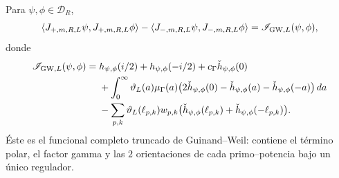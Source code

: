 \begin{lemma}
\label{lem:amp-rh-expansion-guinand-weil}
Para \(\psi,\phi\in\mathcal D_R\),
\begin{equation}\label{eq:amp-rh-diferencia-columnas-regulada}
 \langle J_{+,m,R,L}\psi,J_{+,m,R,L}\phi\rangle
 -\langle J_{-,m,R,L}\psi,J_{-,m,R,L}\phi\rangle
 =
 \mathscr I_{{\rm GW},L}(\psi,\phi),
\end{equation}
donde
\begin{align}
 \mathscr I_{{\rm GW},L}(\psi,\phi)
 ={}&
 h_{\psi,\phi}(i/2)+h_{\psi,\phi}(-i/2)
 +c_\Gamma\check h_{\psi,\phi}(0)                 \nonumber\\
 &+\int_0^\infty\vartheta_L(a)\mu_\Gamma(a)
 \bigl(
 2\check h_{\psi,\phi}(0)
 -\check h_{\psi,\phi}(a)
 -\check h_{\psi,\phi}(-a)
 \bigr)\,da                                       \nonumber\\
 &-\sum_{p,k}\vartheta_L(\ell_{p,k})w_{p,k}
 \bigl(
 \check h_{\psi,\phi}(\ell_{p,k})
 +\check h_{\psi,\phi}(-\ell_{p,k})
 \bigr).                              \label{eq:amp-rh-gw-truncado-explicito}
\end{align}
Éste es el funcional completo truncado de Guinand--Weil: contiene el
término polar, el factor gamma y las \(2\) orientaciones de cada
primo--potencia bajo un único regulador.
\end{lemma}

